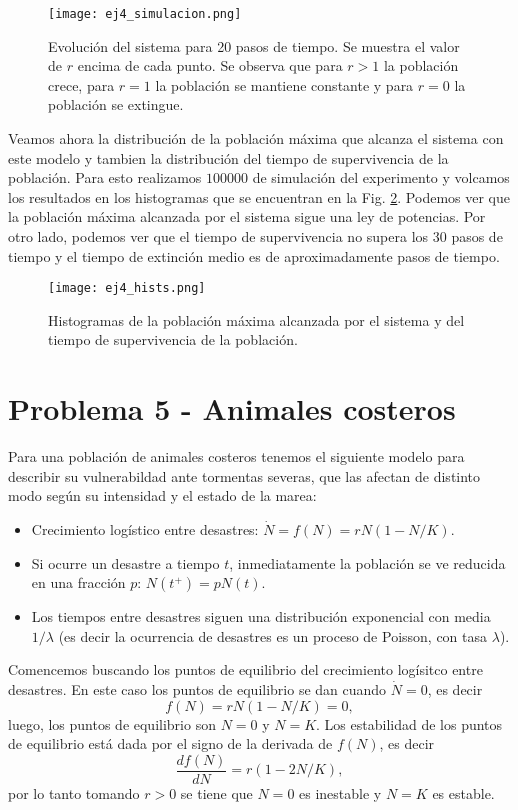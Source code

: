 \documentclass[letterpaper,12pt]{article}
\theoremstyle{plain}
\begin{document}
\begin{figure}[h]
    \centering
    \texttt{[image: ej4\_simulacion.png]}
    \caption{Evolución del sistema para 20 pasos de tiempo. Se muestra el valor de $r$ encima de cada punto. Se observa que para $r>1$ la población crece, para $r=1$ la población se mantiene constante y para $r=0$ la población se extingue.} 
    \label{fig:ej4_simulacion}
\end{figure}

Veamos ahora la distribución de la población máxima que alcanza el sistema con este modelo y tambien la distribución del tiempo de supervivencia de la población. Para esto realizamos $100000$ de simulación del experimento y volcamos los resultados en los histogramas que se encuentran en la Fig. \ref*{fig:ej4_hists}. Podemos ver que la población máxima alcanzada por el sistema sigue una ley de potencias. Por otro lado, podemos ver que el tiempo de supervivencia no supera los 30 pasos de tiempo y el tiempo de extinción medio es de aproximadamente  pasos de tiempo.  

\begin{figure}[h]
    \centering
    \texttt{[image: ej4\_hists.png]}
    \caption{Histogramas de la población máxima alcanzada por el sistema y del tiempo de supervivencia de la población.} 
    \label{fig:ej4_hists}
\end{figure}


\section*{Problema 5 - Animales costeros}

Para una población de animales costeros tenemos el siguiente modelo para describir su vulnerabildad ante tormentas severas, que las afectan de distinto modo según su intensidad y el estado de la marea:
\begin{itemize}
    \item Crecimiento logístico entre desastres: $ \dot{N} = f(N) = rN(1 - N/K)$.
    \item Si ocurre un desastre a tiempo $t$, inmediatamente la población se ve reducida en una fracción $p$: $N(t^+) = pN(t)$.
    \item Los tiempos entre desastres siguen una distribución exponencial con media $1/\lambda$ (es decir la ocurrencia de desastres es un proceso de Poisson, con tasa $\lambda$).
\end{itemize}
Comencemos buscando los puntos de equilibrio del crecimiento logísitco entre desastres. En este caso los puntos de equilibrio se dan cuando $\dot{N} = 0$, es decir
\begin{equation}
    f(N) = rN(1 - N/K) = 0,
\end{equation}
luego, los puntos de equilibrio son $N=0$ y $N=K$. Los estabilidad de los puntos de equilibrio está dada por el signo de la derivada de $f(N)$, es decir    
\begin{equation}
    \frac{d f(N)}{d N} = r(1 - 2N/K), 
\end{equation}
por lo tanto tomando $r>0$ se tiene que $N=0$ es inestable y $N=K$ es estable. 
\end{document}
